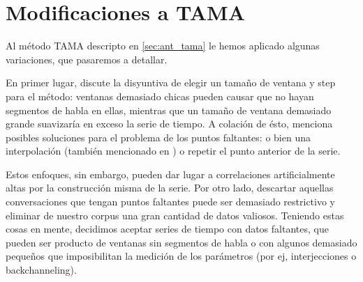 \section{Modificaciones a TAMA}

Al método TAMA descripto en \ref{sec:ant_tama} le hemos aplicado algunas variaciones, que pasaremos a detallar.

En primer lugar, \cite{KOU2008.2} discute la disyuntiva de elegir un tamaño de ventana y step para el método: ventanas demasiado chicas pueden causar que no hayan segmentos de habla en ellas, mientras que un tamaño de ventana demasiado grande suavizaría en exceso la serie de tiempo. A colación de ésto, menciona posibles soluciones para el problema de los puntos faltantes: o bien una interpolación (también mencionado en \cite{DEL2013}) o repetir el punto anterior de la serie.

Estos enfoques, sin embargo, pueden dar lugar a correlaciones artificialmente altas por la construcción misma de la serie. Por otro lado, descartar aquellas conversaciones que tengan puntos faltantes puede ser demasiado restrictivo y eliminar de nuestro corpus una gran cantidad de datos valiosos. Teniendo estas cosas en mente, decidimos aceptar series de tiempo con datos faltantes, que pueden ser producto de ventanas sin segmentos de habla o con algunos demasiado pequeños que imposibilitan la medición de los parámetros (por ej, interjecciones o backchanneling).



